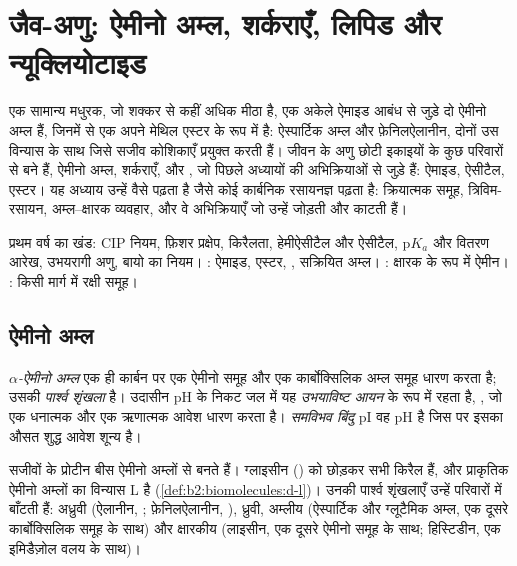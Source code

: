 \chapter{जैव-अणु: ऐमीनो अम्ल, शर्कराएँ, लिपिड और न्यूक्लियोटाइड}\label{ch:b2:biomolecules}

एक सामान्य मधुरक, जो शक्कर से कहीं अधिक मीठा है, एक अकेले ऐमाइड आबंध से जुड़े दो ऐमीनो अम्ल हैं, जिनमें से एक
अपने मेथिल एस्टर के रूप में है: ऐस्पार्टिक अम्ल और फ़ेनिलऐलानीन, दोनों उस विन्यास के साथ जिसे सजीव कोशिकाएँ
प्रयुक्त करती हैं। जीवन के अणु छोटी इकाइयों के कुछ परिवारों से बने हैं, ऐमीनो अम्ल, शर्कराएँ,  और , जो पिछले अध्यायों की अभिक्रियाओं से जुड़े हैं: ऐमाइड, ऐसीटैल, एस्टर। यह
अध्याय उन्हें वैसे पढ़ता है जैसे कोई कार्बनिक रसायनज्ञ पढ़ता है: क्रियात्मक समूह, त्रिविम-रसायन, अम्ल--क्षारक
व्यवहार, और वे अभिक्रियाएँ जो उन्हें जोड़ती और काटती हैं।

\begin{recall}
प्रथम वर्ष का खंड: CIP नियम, फ़िशर प्रक्षेप, किरैलता, हेमीऐसीटैल और ऐसीटैल, $\mathrm pK_a$
और वितरण आरेख, उभयरागी अणु, बायो का नियम। : ऐमाइड,
एस्टर, , सक्रियित अम्ल। : क्षारक के रूप में ऐमीन।
: किसी मार्ग में रक्षी समूह।
\end{recall}

\section{ऐमीनो अम्ल}

\begin{definition}[ऐमीनो अम्ल]\label{def:b2:biomolecules:amino-acid}
\emph{$\alpha$-ऐमीनो अम्ल}  एक ही कार्बन पर एक
ऐमीनो समूह और एक कार्बोक्सिलिक अम्ल समूह धारण करता है;  उसकी \emph{पार्श्व
शृंखला} है। उदासीन pH के निकट जल में यह \emph{उभयाविष्ट आयन} के रूप में रहता है,
, जो एक धनात्मक और एक ऋणात्मक आवेश धारण करता है। \emph{समविभव
बिंदु} pI वह pH है जिस पर इसका औसत शुद्ध आवेश शून्य है।
\end{definition}

सजीवों के प्रोटीन बीस ऐमीनो अम्लों से बनते हैं। ग्लाइसीन () को छोड़कर सभी किरैल हैं, और
प्राकृतिक ऐमीनो अम्लों का विन्यास L है (\cref{def:b2:biomolecules:d-l})। उनकी पार्श्व शृंखलाएँ उन्हें
परिवारों में बाँटती हैं: अध्रुवी (ऐलानीन, ; फ़ेनिलऐलानीन, ), ध्रुवी, अम्लीय
(ऐस्पार्टिक और ग्लूटैमिक अम्ल, एक दूसरे कार्बोक्सिलिक समूह के साथ) और क्षारकीय (लाइसीन, एक दूसरे ऐमीनो
समूह के साथ; हिस्टिडीन, एक इमिडैज़ोल वलय के साथ)।

